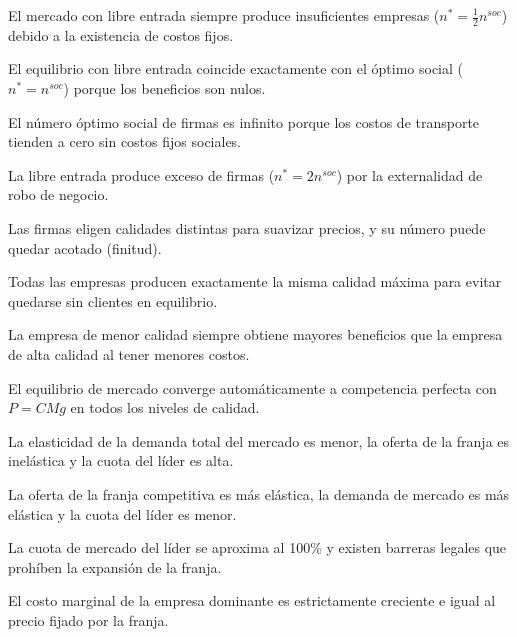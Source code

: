 \begin{opts}
    \item El mercado con libre entrada siempre produce insuficientes empresas ($n^* = \frac{1}{2} n^{soc}$) debido a la existencia de costos fijos.
    \item El equilibrio con libre entrada coincide exactamente con el óptimo social ($n^* = n^{soc}$) porque los beneficios son nulos.
    \item El número óptimo social de firmas es infinito porque los costos de transporte tienden a cero sin costos fijos sociales.
    \item La libre entrada produce exceso de firmas ($n^* = 2 n^{soc}$) por la externalidad de robo de negocio.
\end{opts}

\begin{opts}
    \item Las firmas eligen calidades distintas para suavizar precios, y su número puede quedar acotado (finitud).
    \item Todas las empresas producen exactamente la misma calidad máxima para evitar quedarse sin clientes en equilibrio.
    \item La empresa de menor calidad siempre obtiene mayores beneficios que la empresa de alta calidad al tener menores costos.
    \item El equilibrio de mercado converge automáticamente a competencia perfecta con $P = CMg$ en todos los niveles de calidad.
\end{opts}

\begin{opts}
    \item La elasticidad de la demanda total del mercado es menor, la oferta de la franja es inelástica y la cuota del líder es alta.
    \item La oferta de la franja competitiva es más elástica, la demanda de mercado es más elástica y la cuota del líder es menor.
    \item La cuota de mercado del líder se aproxima al 100\% y existen barreras legales que prohíben la expansión de la franja.
    \item El costo marginal de la empresa dominante es estrictamente creciente e igual al precio fijado por la franja.
\end{opts}

